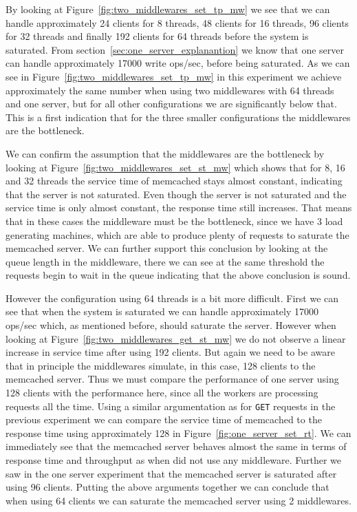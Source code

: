 \documentclass[11pt,a4paper]{article}
\begin{document}
%
By looking at Figure~\ref{fig:two_middlewares_set_tp_mw} we see that we can handle approximately 24 clients for 8 threads, 48 clients for 16 threads, 96 clients for 32 threads and finally 192 clients for 64 threads before the system is saturated.
%
From section~\ref{sec:one_server_explanantion} we know that one server can handle approximately 17000 write ops/sec, before being saturated.
%
As we can see in Figure~\ref{fig:two_middlewares_set_tp_mw} in this experiment we achieve approximately the same number when using two middlewares with 64 threads and one server, but for all other configurations we are significantly below that.
%
This is a first indication that for the three smaller configurations the middlewares are the bottleneck.
%
\par
%
We can confirm the assumption that the middlewares are the bottleneck by looking at Figure~\ref{fig:two_middlewares_set_st_mw} which shows that for 8, 16 and 32 threads the service time of memcached stays almost constant, indicating that the server is not saturated. 
%
Even though the server is not saturated and the service time is only almost constant, the response time still increases.
%
That means that in these cases the middleware must be the bottleneck, since we have 3 load generating machines, which are able to produce plenty of requests to saturate the memcached server.
%
We can further support this conclusion by looking at the queue length in the middleware, there we can see at the same threshold the requests begin to wait in the queue indicating that the above conclusion is sound.
%
\par
%
However the configuration using 64 threads is a bit more difficult.
%
First we can see that when the system is saturated we can handle approximately 17000 ops/sec which, as mentioned before, should saturate the server.
%
However when looking at Figure~\ref{fig:two_middlewares_get_st_mw} we do not observe a linear increase in service time after using 192 clients.
%
But again we need to be aware that in principle the middlewares simulate, in this case, 128 clients to the memcached server.
%
Thus we must compare the performance of one server using 128 clients with the performance here, since all the workers are processing requests all the time.
%
Using a similar argumentation as for \texttt{GET} requests in the previous experiment we can compare the service time of memcached to the response time using approximately 128 in Figure~\ref{fig:one_server_set_rt}.
%
We can immediately see that the memcached server behaves almost the same in terms of response time and throughput as when did not use any middleware.
%
Further we saw in the one server experiment that the memcached server is saturated after using 96 clients.
%
Putting the above arguments together we can conclude that when using 64 clients we can saturate the memcached server using 2 middlewares.
%
\end{document}
